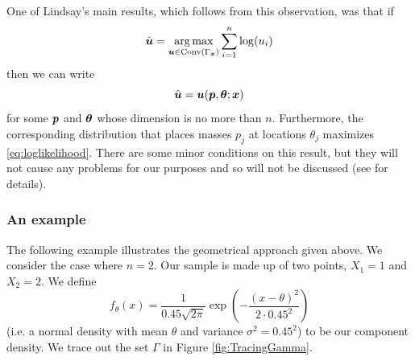 		One of Lindsay's main results, which follows from this observation, was that if
		\begin{equation}
			\hat{{\bm{{u}}}} = \operatorname*{arg\,max}_{{\bm{{u}}} \in \mathrm{Conv}(\Gamma_{{\bm{{x}}}})} \sum_{i=1}^n \log(u_i)
			\label{eq:optimalu}
		\end{equation}
		then we can write
		\begin{equation}
			\hat{{\bm{{u}}}} = {\bm{{u}}}({\bm{{p}}},{\bm{{\theta}}};{\bm{{x}}})
		\end{equation}
		for some ${\bm{{p}}}$ and ${\bm{{\theta}}}$ whose dimension is no more than $n$. Furthermore, the corresponding distribution that places masses $p_j$ at locations $\theta_j$ maximizes \eqref{eq:loglikelihood}. There are some minor conditions on this result, but they will not cause any problems for our purposes and so will not be discussed (see \cite{Lindsay1983-tf} for details).
	\subsubsection{An example}
		\label{sec:mixturelikelihoods:example}
		The following example illustrates the geometrical approach given above. We consider the case where $n = 2$. Our sample is made up of two points, $X_1 = 1$ and $X_2 = 2$. We define
		\begin{equation}
		f_\theta(x) = \frac{1}{0.45 \sqrt{2 \pi}} \exp\left(-\frac{(x-\theta)^2}{2\cdot 0.45^2}\right)
		\end{equation}
		(i.e. a normal density with mean $\theta$ and variance $\sigma^2 = 0.45^2$) to be our component density.
		We trace out the set $\Gamma$ in Figure \ref{fig:TracingGamma}. 

